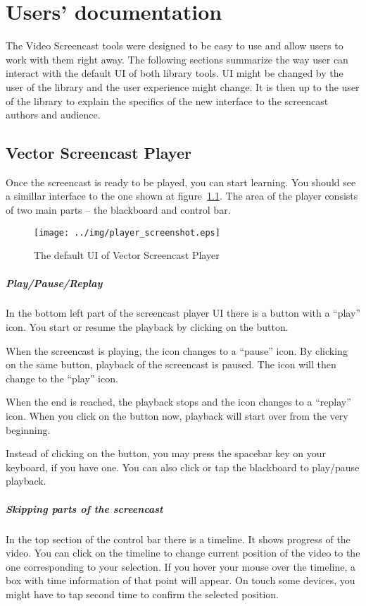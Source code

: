 \chapter{Users' documentation}
The Video Screencast tools were designed to be easy to use and allow users to work with them right away. The following sections summarize the way user can interact with the default UI of both library tools. UI might be changed by the user of the library and the user experience might change. It is then up to the user of the library to explain the specifics of the new interface to the screencast authors and audience.

\section{Vector Screencast Player}
Once the screencast is ready to be played, you can start learning. You should see a simillar interface to the one shown at figure~\ref{fig:player}. The area of the player consists of two main parts -- the blackboard and control bar.

\begin{figure}
	\centering
		\texttt{[image: ../img/player\_screenshot.eps]}
		\caption{The default UI of Vector Screencast Player\label{fig:player}}
\end{figure}

\paragraph{Play/Pause/Replay}
In the bottom left part of the screencast player UI there is a button with a ``play'' icon. You start or resume the playback by clicking on the button.

When the screencast is playing, the icon changes to a ``pause'' icon. By clicking on the same button, playback of the screencast is paused. The icon will then change to the ``play'' icon.

When the end is reached, the playback stops and the icon changes to a ``replay'' icon. When you click on the button now, playback will start over from the very beginning.

Instead of clicking on the button, you may press the spacebar key on your keyboard, if you have one. You can also click or tap the blackboard to play/pause playback.

\paragraph{Skipping parts of the screencast}
In the top section of the control bar there is a timeline. It shows progress of the video. You can click on the timeline to change current position of the video to the one corresponding to your selection. If you hover your mouse over the timeline, a box with time information of that point will appear. On touch some devices, you might have to tap second time to confirm the selected position.

